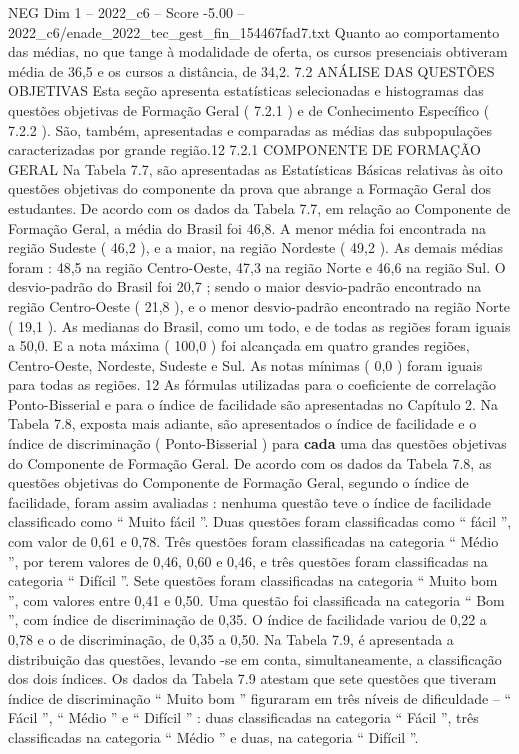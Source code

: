 \begin{textsample}{NEG Dim 1 – 2022\_c6 – Score -5.00 – 2022\_c6/enade\_2022\_tec\_gest\_fin\_154467fad7.txt}
Quanto ao comportamento das médias, no que tange à modalidade de oferta, os cursos presenciais obtiveram média de 36,5 e os cursos a distância, de 34,2. 7.2 ANÁLISE DAS QUESTÕES OBJETIVAS Esta seção apresenta estatísticas selecionadas e histogramas das questões objetivas de Formação Geral ( 7.2.1 ) e de Conhecimento Específico ( 7.2.2 ).
São, também, apresentadas e comparadas as médias das subpopulações caracterizadas por grande região.12 7.2.1 COMPONENTE DE FORMAÇÃO GERAL Na Tabela 7.7, são apresentadas as Estatísticas Básicas relativas às oito questões objetivas do componente da prova que abrange a Formação Geral dos estudantes.
De acordo com os dados da Tabela 7.7, em relação ao Componente de Formação Geral, a média do Brasil foi 46,8.
A menor média foi encontrada na região Sudeste ( 46,2 ), e a maior, na região Nordeste ( 49,2 ).
As demais médias foram : 48,5 na região Centro-Oeste, 47,3 na região Norte e 46,6 na região Sul.
O desvio-padrão do Brasil foi 20,7 ; sendo o maior desvio-padrão encontrado na região Centro-Oeste ( 21,8 ), e o menor desvio-padrão encontrado na região Norte ( 19,1 ).
As medianas do Brasil, como um todo, e de todas as regiões foram iguais a 50,0.
E a nota máxima ( 100,0 ) foi alcançada em quatro grandes regiões, Centro-Oeste, Nordeste, Sudeste e Sul.
As notas mínimas ( 0,0 ) foram iguais para todas as regiões. 12 As fórmulas utilizadas para o coeficiente de correlação Ponto-Bisserial e para o índice de facilidade são apresentadas no Capítulo 2.
Na Tabela 7.8, exposta mais adiante, são apresentados o índice de facilidade e o índice de discriminação ( Ponto-Bisserial ) para \textbf{cada} uma das questões objetivas do Componente de Formação Geral.
De acordo com os dados da Tabela 7.8, as questões objetivas do Componente de Formação Geral, segundo o índice de facilidade, foram assim avaliadas : nenhuma questão teve o índice de facilidade classificado como “ Muito fácil ”.
Duas questões foram classificadas como “ fácil ”, com valor de 0,61 e 0,78.
Três questões foram classificadas na categoria “ Médio ”, por terem valores de 0,46, 0,60 e 0,46, e três questões foram classificadas na categoria “ Difícil ”.
Sete questões foram classificadas na categoria “ Muito bom ”, com valores entre 0,41 e 0,50.
Uma questão foi classificada na categoria “ Bom ”, com índice de discriminação de 0,35.
O índice de facilidade variou de 0,22 a 0,78 e o de discriminação, de 0,35 a 0,50.
Na Tabela 7.9, é apresentada a distribuição das questões, levando -se em conta, simultaneamente, a classificação dos dois índices.
Os dados da Tabela 7.9 atestam que sete questões que tiveram índice de discriminação “ Muito bom ” figuraram em três níveis de dificuldade – “ Fácil ”, “ Médio ” e “ Difícil ” : duas classificadas na categoria “ Fácil ”, três classificadas na categoria “ Médio ” e duas, na categoria “ Difícil ”.

\end{textsample}
